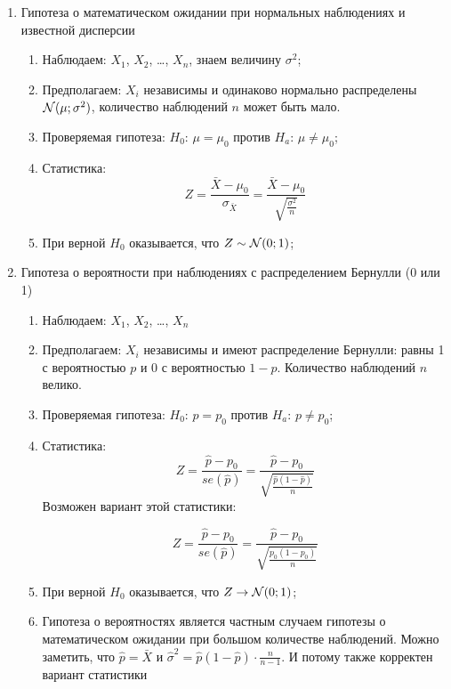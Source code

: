 \documentclass[12pt, a4paper]{article}
\begin{document}
\begin{enumerate}
  \item Гипотеза о математическом ожидании при нормальных наблюдениях и известной дисперсии
    \begin{enumerate}

      \item Наблюдаем: $X_1$, $X_2$, \ldots, $X_n$, знаем величину $\sigma^2$;

      \item Предполагаем: $X_i$ независимы и одинаково нормально распределены $\mathcal{N}(\mu; \sigma^2)$, количество наблюдений $n$ может быть мало.

      \item Проверяемая гипотеза: $H_0$: $\mu = \mu_0$ против $H_a$: $\mu \neq \mu_0$;

      \item Статистика:
	\[
	  Z = \frac{\bar X - \mu_0}{\sigma_{\bar X}} = \frac{\bar X - \mu_0}{\sqrt{\frac{\sigma^2}{n}}}
	\]

      \item При верной $H_0$ оказывается, что $Z \sim \mathcal{N}(0;1)$;


    \end{enumerate}



  \item Гипотеза о вероятности при наблюдениях с распределением Бернулли (0 или 1)
  \begin{enumerate}

      \item Наблюдаем: $X_1$, $X_2$, \ldots, $X_n$

      \item Предполагаем: $X_i$ независимы и имеют распределение Бернулли: равны 1 с вероятностью $p$ и 0 с вероятностью $1-p$. Количество наблюдений $n$ велико.

      \item Проверяемая гипотеза: $H_0$: $p = p_0$ против $H_a$: $p \neq p_0$;

      \item Статистика:
	\[
	  Z = \frac{\hat p - p_0}{se(\hat p)} = \frac{\hat p - p_0}{\sqrt{\frac{\hat p (1- \hat p)}{n}}}
      \]
      Возможен вариант этой статистики:

	\[
	  Z = \frac{\hat p - p_0}{se(\hat p)} = \frac{\hat p - p_0}{\sqrt{\frac{p_0 (1- p_0 )}{n}}}
      \]


     \item При верной $H_0$ оказывается, что $Z \to \mathcal{N}(0;1)$;

     \item Гипотеза о вероятностях является частным случаем гипотезы о математическом ожидании при большом количестве наблюдений. Можно заметить, что $\hat p = \bar X$ и $\hat \sigma^2 = \hat p (1- \hat p) \cdot \frac{n}{n-1}$. И потому также корректен вариант статистики


\end{enumerate}
\end{enumerate}
\end{document}
